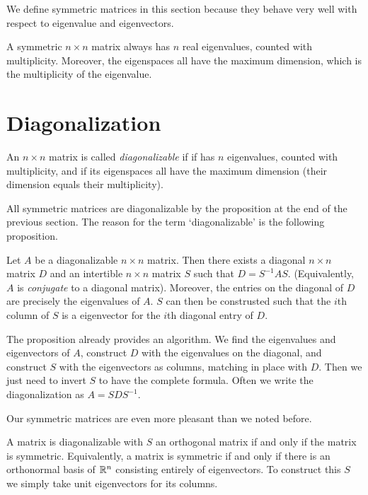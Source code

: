 \documentclass[fleqn]{report}
\begin{document}
We define symmetric matrices in this section because they
behave very well with respect to eigenvalue and eigenvectors.

\begin{prop}
A symmetric $n \times n$ matrix always has $n$ real eigenvalues,
counted with multiplicity. Moreover, the eigenspaces all have
the maximum dimension, which is the multiplicity of the
eigenvalue.
\end{prop}

\chapter{Diagonalization}
\label{diagonalization}

\begin{defn}
An $n \times n$ matrix is called \emph{diagonalizable} if if
has $n$ eigenvalues, counted with multiplicity, and if its
eigenspaces all have the maximum dimension (their dimension
equals their multiplicity).
\end{defn}

All symmetric matrices are diagonalizable by the
proposition at the end of the previous section. The reason
for the term `diagonalizable' is the following proposition.

\begin{prop}
Let $A$ be a diagonalizable $n \times n$ matrix. Then there
exists a diagonal $n \times n$ matrix $D$ and an intertible $n
\times n$ matrix $S$ such that $D = S^{-1}AS$. (Equivalently,
$A$ is \emph{conjugate} to a diagonal matrix). Moreover, the
entries on the diagonal of $D$ are precisely the eigenvalues
of $A$. $S$ can then be construsted such that the $i$th column
of $S$ is a eigenvector for the $i$th diagonal entry of $D$.
\end{prop}

The proposition already provides an algorithm. We find the
eigenvalues and eigenvectors of $A$, construct $D$ with the
eigenvalues on the diagonal, and construct $S$ with the
eigenvectors as columns, matching in place with $D$. Then we
just need to invert $S$ to have the complete formula. Often
we write the diagonalization as $A = SDS^{-1}$. 

Our symmetric matrices are even more pleasant than we noted
before.

\begin{prop}
A matrix is diagonalizable with $S$ an orthogonal matrix if
and only if the matrix is symmetric. Equivalently, a matrix
is symmetric if and only if there is an orthonormal basis of
$\mathbb{R}^n$ consisting entirely of eigenvectors. To construct
this $S$ we simply take unit eigenvectors for its columns.
\end{prop}
\end{document}
